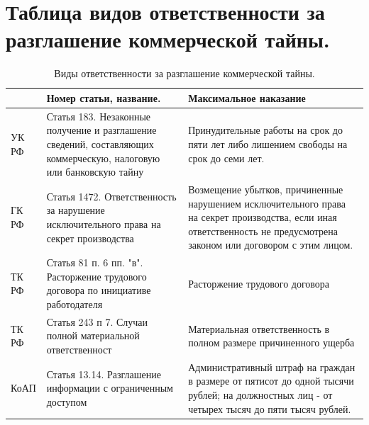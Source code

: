 \documentclass[12pt,a4paper,report]{article}
\begin{document}
    \newpage
    \section{Таблица видов ответственности за разглашение коммерческой тайны.}
    \begin{table}[h!]
      \caption{Виды ответственности за разглашение коммерческой тайны.}
      \begin{tabular}[c]{| l | p{200pt} | p{200pt} |}
      \hline
       & \textbf{Номер статьи, название.} & \textbf{Максимальное наказание} \\
      \hline
      УК РФ &
      Статья 183. Незаконные получение и разглашение сведений, составляющих коммерческую, налоговую или банковскую тайну &	Принудительные работы на срок до пяти лет либо лишением свободы на срок до семи лет.\\
      \hline
      ГК РФ &
      Статья 1472. Ответственность за нарушение исключительного права на секрет производства &
      Возмещение убытков, причиненные нарушением исключительного права на секрет производства, если иная ответственность не предусмотрена законом или договором с этим лицом.\\
      \hline
      ТК РФ &
      Статья 81 п. 6 пп. "в". Расторжение трудового договора по инициативе работодателя &
      Расторжение трудового договора \\
      \hline
      ТК РФ &
      Статья 243 п 7. Случаи полной материальной ответственност &
      Материальная ответственность в полном размере причиненного ущерба \\
      \hline
      КоАП &
      Статья 13.14. Разглашение информации с ограниченным доступом &
      Административный штраф на граждан в размере от пятисот до одной тысячи рублей; на должностных лиц - от четырех тысяч до пяти тысяч рублей. \\

      \hline
      \end{tabular}
    \end{table}

\end{document}
